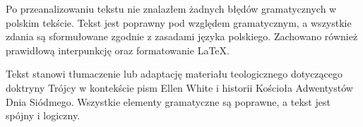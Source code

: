 Po przeanalizowaniu tekstu nie znalazłem żadnych błędów gramatycznych w polskim tekście. Tekst jest poprawny pod względem gramatycznym, a wszystkie zdania są sformułowane zgodnie z zasadami języka polskiego. Zachowano również prawidłową interpunkcję oraz formatowanie LaTeX.

Tekst stanowi tłumaczenie lub adaptację materiału teologicznego dotyczącego doktryny Trójcy w kontekście pism Ellen White i historii Kościoła Adwentystów Dnia Siódmego. Wszystkie elementy gramatyczne są poprawne, a tekst jest spójny i logiczny.